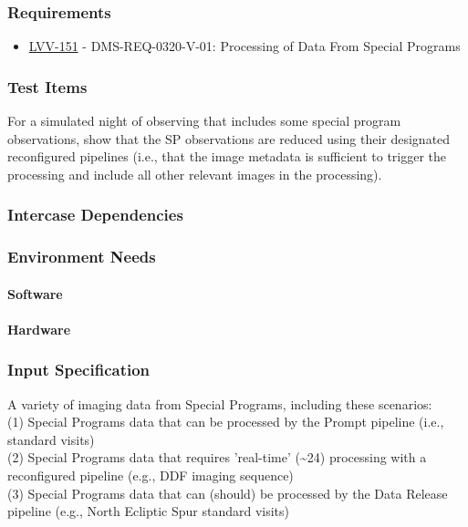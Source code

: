 \subsubsection{Requirements}
\begin{itemize}
\item \href{https://jira.lsstcorp.org/browse/LVV-151}{LVV-151} - DMS-REQ-0320-V-01: Processing of Data From Special Programs
\end{itemize}

\subsubsection{Test Items}
For a simulated night of observing that includes some special program
observations, show that the SP observations are reduced using their
designated reconfigured pipelines (i.e., that the image metadata is
sufficient to trigger the processing and include all other relevant
images in the processing).



\subsubsection{Intercase Dependencies}

\subsubsection{Environment Needs}

\paragraph{Software}

\paragraph{Hardware}

\subsubsection{Input Specification}
A variety of imaging data from Special Programs, including these
scenarios:\\
(1) Special Programs data that can be processed by the Prompt pipeline
(i.e., standard visits)\\
(2) Special Programs data that requires 'real-time'
(\textasciitilde{}24) processing with a reconfigured pipeline (e.g., DDF
imaging sequence)\\
(3) Special Programs data that can (should) be processed by the Data
Release pipeline (e.g., North Ecliptic Spur standard visits)


